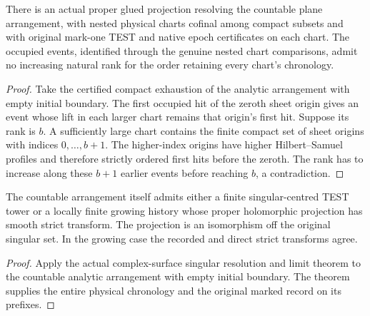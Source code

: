 \begin{theorem}
\label{hir:g8-certified-arrangement-no-clock}
\leanok
There is an actual proper glued projection resolving the countable
plane arrangement, with nested physical charts cofinal among
compact subsets and with original mark-one TEST and native epoch
certificates on each chart. The occupied events, identified through
the genuine nested chart comparisons, admit no increasing natural
rank for the order retaining every chart's chronology.
\end{theorem}
\begin{proof}
Take the certified compact exhaustion of the analytic arrangement
with empty initial boundary. The first occupied hit of the zeroth
sheet origin gives an event whose lift in each larger chart remains
that origin's first hit. Suppose its rank is $b$. A sufficiently
large chart contains the finite compact set of sheet origins with
indices $0,\ldots,b+1$. The higher-index origins have higher
Hilbert--Samuel profiles and therefore strictly ordered first
hits before the zeroth. The rank has to increase along these
$b+1$ earlier events before reaching $b$, a contradiction.
\end{proof}

\begin{corollary}
\label{hir:g8-arrangement-physical-chronology}
\leanok
The countable arrangement itself admits either a finite
singular-centred TEST tower or a locally finite growing history
whose proper holomorphic projection has smooth strict transform.
The projection is an isomorphism off the original singular set.
In the growing case the recorded and direct strict transforms agree.
\end{corollary}
\begin{proof}
Apply the actual complex-surface singular resolution and limit
theorem to the countable analytic arrangement with empty initial
boundary. The theorem supplies the entire physical chronology and
the original marked record on its prefixes.
\end{proof}

